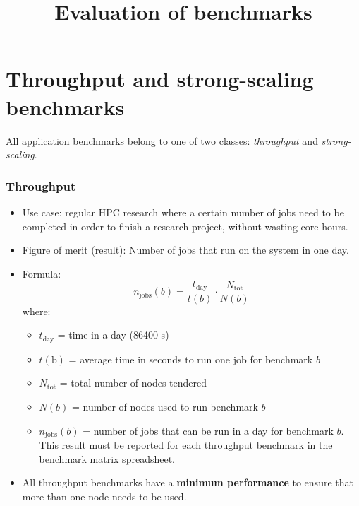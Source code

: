 \documentclass{article}
\begin{document}
\title{Evaluation of benchmarks}

\maketitle

\section*{Throughput and strong-scaling benchmarks}

All application benchmarks belong to one of two classes: \textit{throughput} and \textit{strong-scaling}.

\subsubsection*{Throughput}

\begin{itemize}
    \item Use case: regular HPC research where a certain number of jobs need to be completed in order to finish a research project, without wasting core hours. 
    \item Figure of merit (result): Number of jobs that run on the system in one day.
    \item Formula:
    \begin{equation}
        n_{\textrm{jobs}}(b) = \frac{t_{\textrm{day}}}{t(b)} \cdot \frac{N_{\textrm{tot}}}{N(b)}       
    \end{equation}
    where:
    \begin{itemize}
        \item $t_{\textrm{day}}$ = time in a day (86400 s)
        \item $t(\textrm{b})$ = average time in seconds to run one job for benchmark $b$
        \item $N_{\textrm{tot}}$ = total number of nodes tendered
        \item $N(b)$ = number of nodes used to run benchmark $b$
        \item $n_{\textrm{jobs}}(b)$ = number of jobs that can be run in a day for benchmark $b$. This result must be reported for each throughput benchmark in the benchmark matrix spreadsheet.
    \end{itemize}
    \item All throughput benchmarks have a \textbf{minimum performance} to ensure that more than one node needs to be used.

\end{itemize}
\end{document}
